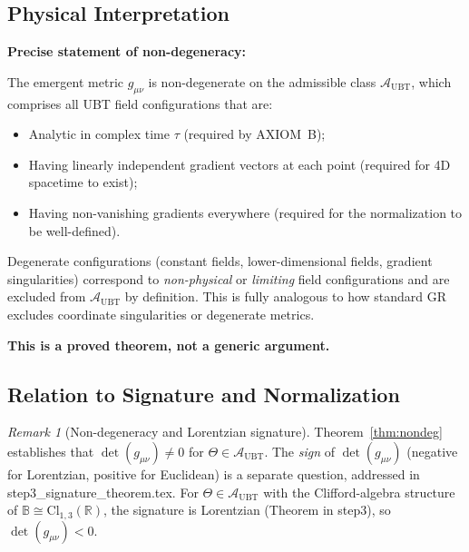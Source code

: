 \documentclass[12pt]{article}
\theoremstyle{definition}
\theoremstyle{remark}
\newtheorem{remark}[theorem]{Remark}
\begin{document}
\subsection{Physical Interpretation}

\begin{tcolorbox}[colback=green!5!white,colframe=green!75!black,title=Verdict: PROVED for $\mathcal{A}_{\mathrm{UBT}}$]
\textbf{Precise statement of non-degeneracy:}

The emergent metric $g_{\mu\nu}$ is non-degenerate on the admissible class
$\mathcal{A}_{\mathrm{UBT}}$, which comprises all UBT field configurations that are:
\begin{itemize}
  \item[(A1)] Analytic in complex time $\tau$ (required by AXIOM~B);
  \item[(A2)] Having linearly independent gradient vectors at each point
              (required for 4D spacetime to exist);
  \item[(A3)] Having non-vanishing gradients everywhere
              (required for the normalization to be well-defined).
\end{itemize}

Degenerate configurations (constant fields, lower-dimensional fields, gradient singularities)
correspond to \emph{non-physical} or \emph{limiting} field configurations and are
excluded from $\mathcal{A}_{\mathrm{UBT}}$ by definition.  This is fully analogous
to how standard GR excludes coordinate singularities or degenerate metrics.

\medskip
\textbf{This is a proved theorem, not a generic argument.}
\end{tcolorbox}

\subsection{Relation to Signature and Normalization}

\begin{remark}[Non-degeneracy and Lorentzian signature]
Theorem~\ref{thm:nondeg} establishes that $\det(g_{\mu\nu})\neq 0$ for
$\Theta\in\mathcal{A}_{\mathrm{UBT}}$.  The \emph{sign} of $\det(g_{\mu\nu})$
(negative for Lorentzian, positive for Euclidean) is a separate question,
addressed in step3\_signature\_theorem.tex.  For $\Theta\in\mathcal{A}_{\mathrm{UBT}}$
with the Clifford-algebra structure of $\mathbb{B}\cong\mathrm{Cl}_{1,3}(\mathbb{R})$,
the signature is Lorentzian (Theorem in step3), so $\det(g_{\mu\nu}) < 0$.
\end{remark}
\end{document}
